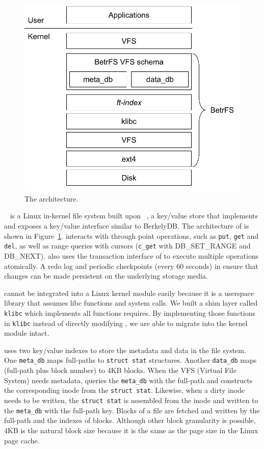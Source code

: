 \begin{figure}
    \centering
    \includegraphics{proposal/fig/betrfs}
    \caption[The \betrfs architecture]{\label{fig:betrfs}
        The \betrfs architecture.}
\end{figure}

\betrfs~\citep{betrfs1,betrfs1tos} is a Linux in-kernel file
system built upon \fti~\citep{fti}, a key/value store that implements \bets and
exposes a key/value interface similar to BerkelyDB.
The architecture of \betrfs is shown in Figure~\ref{fig:betrfs}.
\betrfs interacts with \fti through point operations, such as \texttt{put},
\texttt{get} and \texttt{del}, as well as range queries with cursors
(\texttt{c\_get} with DB\_SET\_RANGE and DB\_NEXT).
\betrfs also uses the transaction interface of \fti to execute multiple
operations atomically.
A redo log and periodic checkpoints (every 60 seconds) in \fti ensure that
changes can be made persistent on the underlying storage media.

\Fti cannot be integrated into a Linux kernel module easily because
it is a userspace library that assumes libc functions and system calls.
We built a shim layer called \texttt{klibc} which implements all functions \fti
requires.
By implementing those functions in \texttt{klibc} instead of directly modifying
\fti, we are able to migrate \fti into the kernel module intact.

\betrfs uses two key/value indexes to store the metadata and data in the file
system.
One \texttt{meta\_db} maps full-paths to \texttt{struct stat} structures.
Another \texttt{data\_db} maps (full-path plus block number) to 4KB blocks.
When the VFS (Virtual File System) needs metadata, \betrfs queries
the \texttt{meta\_db} with the full-path and constructs the corresponding inode
from the \texttt{struct stat}.
Likewise, when a dirty inode needs to be written, the \texttt{struct stat} is
assembled from the inode and written to the \texttt{meta\_db} with the
full-path key.
Blocks of a file are fetched and written by the full-path and the indexes of
blocks.
Although other block granularity is possible, 4KB is the natural block size
because it is the same as the page size in the Linux page cache.


